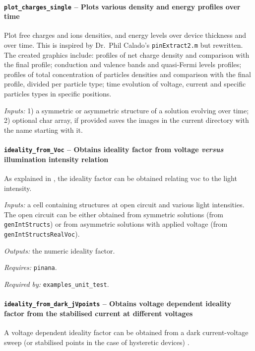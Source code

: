 		\paragraph{\texttt{plot\_charges\_single} -- Plots various density and energy profiles over time}
Plot free charges and ions densities, and energy levels over device thickness and over time.
 This is inspired by Dr.\ Phil Calado's \texttt{pinExtract2.m} but rewritten.
 The created graphics include: profiles of net charge density and 
 comparison with the final profile; conduction and valence bands and 
 quasi-Fermi levels profiles; profiles of total concentration of 
 particles densities and comparison with the final profile, divided 
 per particle type; time evolution of voltage, current and specific 
 particles types in specific positions.

		\textit{Inputs:} 1) a symmetric or asymmetric structure of a solution evolving over time;
		2) optional char array, if provided saves the images in the current directory with the name starting with it.

			\paragraph{\texttt{ideality\_from\_Voc} -- Obtains ideality factor from voltage \textsl{versus} illumination intensity relation}\label{dd_ideality}
	As explained in , the ideality factor can be obtained relating \gls{voc} to the light intensity.
	
			\textit{Inputs:} a cell containing structures at open circuit and various
	     light intensities. The open circuit can be either obtained from
	     symmetric solutions (from \texttt{gen\-Int\-Structs}) or from asymmetric solutions
	     with applied voltage (from \texttt{gen\-Int\-Structs\-Real\-Voc}).
	
	\textit{Outputs:} the numeric ideality factor.
	
	\textit{Requires:} \texttt{pinana}.
	
	\textit{Required by:} \texttt{examples\_unit\_test}.
	
				\paragraph{\texttt{ideality\_from\_dark\_jVpoints} -- Obtains voltage dependent ideality factor from the stabilised current at different voltages}
	A voltage dependent ideality factor can be obtained from a dark current\hyp{}voltage sweep (or stabilised points in the case of hysteretic devices) \cite{Honsberg2019}.
	
